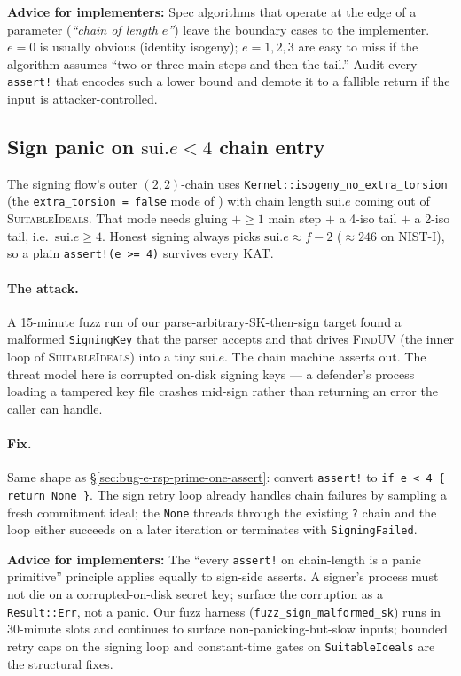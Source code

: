 \noindent
\textbf{Advice for implementers:}  Spec algorithms that
operate at the edge of a parameter (\textit{``chain of length
$e$''}) leave the boundary cases to the implementer.
$e = 0$ is usually obvious (identity isogeny); $e = 1, 2, 3$
are easy to miss if the algorithm assumes ``two or three main
steps and then the tail.''  Audit every \texttt{assert!} that
encodes such a lower bound and demote it to a fallible return
if the input is attacker-controlled.

\subsection{Sign panic on $\mathrm{sui}.e < 4$ chain entry}
\label{sec:bug-isogeny-no-extra-torsion-e-lt-4}

The signing flow's outer $(2,2)$-chain uses
\texttt{Kernel::isogeny\_no\_extra\_torsion} (the
\texttt{extra\_torsion = false} mode of
) with chain length $\mathrm{sui}.e$ coming out of
\textsc{SuitableIdeals}.  That mode needs gluing $+\geq 1$
main step $+$ a 4-iso tail $+$ a 2-iso tail, i.e.\
$\mathrm{sui}.e \geq 4$.  Honest signing always picks
$\mathrm{sui}.e \approx f - 2$ ($\approx 246$ on NIST-I), so a
plain \texttt{assert!(e >= 4)} survives every KAT.

\paragraph{The attack.}  A 15-minute fuzz run of our
parse-arbitrary-SK-then-sign target found a malformed
\texttt{SigningKey} that the parser accepts and that drives
\textsc{FindUV} (the inner loop of \textsc{SuitableIdeals})
into a tiny $\mathrm{sui}.e$.  The chain machine asserts
out.  The threat model here is corrupted on-disk signing
keys --- a defender's process loading a tampered key file
crashes mid-sign rather than returning an error the
caller can handle.

\paragraph{Fix.}  Same shape as
\S\ref{sec:bug-e-rsp-prime-one-assert}: convert
\texttt{assert!} to \texttt{if e < 4 \{ return None \}}.  The
sign retry loop already handles chain failures by sampling a
fresh commitment ideal; the \texttt{None} threads through
the existing \texttt{?} chain and the loop either succeeds on
a later iteration or terminates with
\texttt{SigningFailed}.

\noindent
\textbf{Advice for implementers:}  The
``every \texttt{assert!} on chain-length is a panic
primitive'' principle applies equally to sign-side asserts.
A signer's process must not die on a corrupted-on-disk
secret key; surface the corruption as a \texttt{Result::Err},
not a panic.  Our fuzz harness (\texttt{fuzz\_sign\_malformed\_sk})
runs in 30-minute slots and continues to surface
non-panicking-but-slow inputs; bounded retry caps on the
signing loop and constant-time gates on
\texttt{SuitableIdeals} are the structural fixes.

